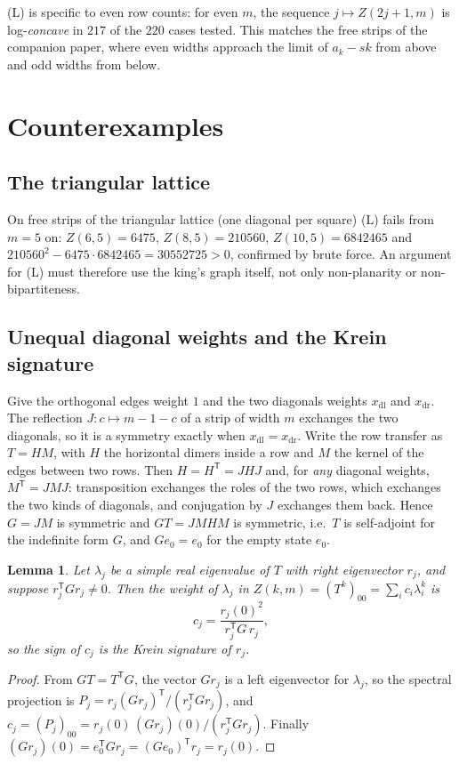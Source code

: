 \documentclass[11pt]{amsart}
\newtheorem{lemma}[theorem]{Lemma}
\theoremstyle{definition}
\theoremstyle{remark}
\begin{document}
(L) is specific to even row counts: for even $m$, the sequence $j \mapsto Z(2j + 1, m)$ is
log-\emph{concave} in $217$ of the $220$ cases tested. This matches the free strips of the
companion paper, where even widths approach the limit of $a_k - sk$ from above and odd widths from
below.

\section{Counterexamples}\label{sec:counter}

\subsection{The triangular lattice}
On free strips of the triangular lattice (one diagonal per square) (L) fails from $m = 5$ on:
$Z(6, 5) = 6475$, $Z(8, 5) = 210560$, $Z(10, 5) = 6842465$ and
$210560^2 - 6475\cdot6842465 = 30552725 > 0$, confirmed by brute force. An argument for (L) must
therefore use the king's graph itself, not only non-planarity or non-bipartiteness.

\subsection{Unequal diagonal weights and the Krein signature}\label{sec:krein}
Give the orthogonal edges weight $1$ and the two diagonals weights $x_{\mathrm{dl}}$ and
$x_{\mathrm{dr}}$. The reflection $J\colon c \mapsto m - 1 - c$ of a strip of width $m$ exchanges the
two diagonals, so it is a symmetry exactly when $x_{\mathrm{dl}} = x_{\mathrm{dr}}$. Write the row
transfer as $T = HM$, with $H$ the horizontal dimers inside a row and $M$ the kernel of the edges
between two rows. Then $H = H^{\mathsf T} = JHJ$ and, for \emph{any} diagonal weights,
$M^{\mathsf T} = JMJ$: transposition exchanges the roles of the two rows, which exchanges the two
kinds of diagonals, and conjugation by $J$ exchanges them back. Hence $G = JM$ is symmetric and $GT = JMHM$ is symmetric, i.e.\ $T$
is self-adjoint for the indefinite form $G$, and $G e_0 = e_0$ for the empty state $e_0$.

\begin{lemma}\label{lem:krein}
Let $\lambda_j$ be a simple real eigenvalue of $T$ with right eigenvector $r_j$, and suppose
$r_j^{\mathsf T} G r_j \ne 0$. Then the weight of $\lambda_j$ in
$Z(k, m) = (T^k)_{00} = \sum_i c_i \lambda_i^k$ is
\[
  c_j = \frac{r_j(0)^2}{r_j^{\mathsf T} G\, r_j},
\]
so the sign of $c_j$ is the Krein signature of $r_j$.
\end{lemma}
\begin{proof}
From $GT = T^{\mathsf T} G$, the vector $G r_j$ is a left eigenvector for $\lambda_j$, so the spectral
projection is $P_j = r_j (G r_j)^{\mathsf T} / (r_j^{\mathsf T} G r_j)$, and
$c_j = (P_j)_{00} = r_j(0)\,(G r_j)(0) / (r_j^{\mathsf T} G r_j)$. Finally
$(G r_j)(0) = e_0^{\mathsf T} G r_j = (G e_0)^{\mathsf T} r_j = r_j(0)$.
\end{proof}
\end{document}
